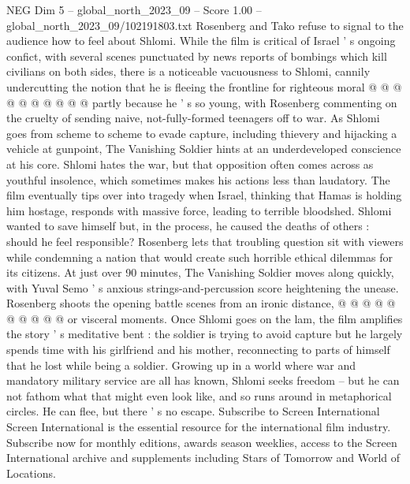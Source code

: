 \begin{textsample}{NEG Dim 5 – global\_north\_2023\_09 – Score 1.00 – global\_north\_2023\_09/102191803.txt}
Rosenberg and Tako refuse to signal to the audience how to feel about Shlomi.
While the film is critical of Israel ' s ongoing confict, with several scenes punctuated by news reports of bombings which kill civilians on both sides, there is a noticeable vacuousness to Shlomi, cannily undercutting the notion that he is fleeing the frontline for righteous moral @ @ @ @ @ @ @ @ @ @ partly because he ' s so young, with Rosenberg commenting on the cruelty of sending naive, not-fully-formed teenagers off to war.
As Shlomi goes from scheme to scheme to evade capture, including thievery and hijacking a vehicle at gunpoint, The Vanishing Soldier hints at an underdeveloped conscience at his core.
Shlomi hates the war, but that opposition often comes across as youthful insolence, which sometimes makes his actions less than laudatory.
The film eventually tips over into tragedy when Israel, thinking that Hamas is holding him hostage, responds with massive force, leading to terrible bloodshed.
Shlomi wanted to save himself but, in the process, he caused the deaths of others : should he feel responsible?
Rosenberg lets that troubling question sit with viewers while condemning a nation that would create such horrible ethical dilemmas for its citizens.
At just over 90 minutes, The Vanishing Soldier moves along quickly, with Yuval Semo ' s anxious strings-and-percussion score heightening the unease.
Rosenberg shoots the opening battle scenes from an ironic distance, @ @ @ @ @ @ @ @ @ @ or visceral moments.
Once Shlomi goes on the lam, the film amplifies the story ' s meditative bent : the soldier is trying to avoid capture but he largely spends time with his girlfriend and his mother, reconnecting to parts of himself that he lost while being a soldier.
Growing up in a world where war and mandatory military service are all has known, Shlomi seeks freedom -- but he can not fathom what that might even look like, and so runs around in metaphorical circles.
He can flee, but there ' s no escape.
Subscribe to Screen International Screen International is the essential resource for the international film industry.
Subscribe now for monthly editions, awards season weeklies, access to the Screen International archive and supplements including Stars of Tomorrow and World of Locations.

\end{textsample}
